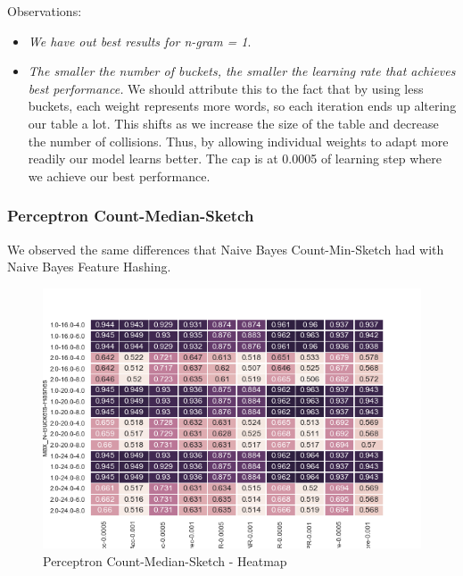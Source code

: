 \documentclass[12pt]{article}
\begin{document}
Observations: 
\begin{itemize}
        \item
          \textit{We have out best results for n-gram = 1}.

        \item
          \textit{The smaller the number of buckets, the smaller the learning rate that achieves best performance.}
          We should attribute this to the fact that by using less buckets, each weight represents more words, so each iteration ends up altering our  table a lot. This shifts as we increase the size of the table and decrease the number of collisions. Thus, by allowing individual weights to adapt more readily our model learns better. The cap is at 0.0005 of learning step where we achieve our best performance.




\end{itemize}

\subsubsection{Perceptron Count-Median-Sketch}
    
    We observed the same differences that Naive Bayes Count-Min-Sketch had with Naive Bayes Feature Hashing. 

\begin{figure}[h]
    \centering
    \includegraphics[scale=0.8]{./SpamFilter/code/pcms}
    \caption{Perceptron Count-Median-Sketch - Heatmap}
    \label{pcms}
\end{figure}
\end{document}
